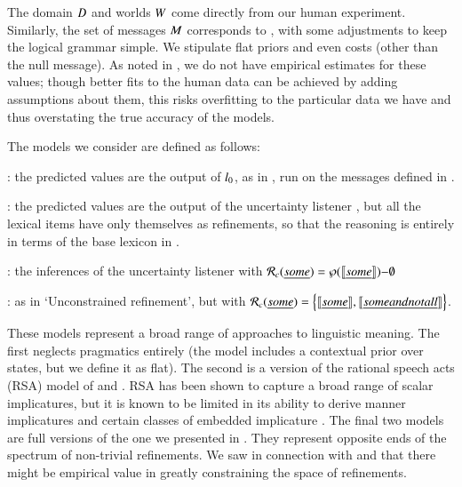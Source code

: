 \documentclass[leqno,12pt]{article}
\begin{document}
The domain $D$ and worlds $W$ come directly from our human
experiment. Similarly, the set of messages $M$ corresponds to
, with some adjustments to keep the logical grammar
simple. We stipulate flat priors and even costs (other than the null
message). As noted in , we do not have empirical
estimates for these values; though better fits to the human data can
be achieved by adding assumptions about them, this risks overfitting
to the particular data we have and thus overstating the true accuracy
of the models.

The models we consider are defined as follows:
%
\begin{examples}
\item 
  \begin{examples}
  \item {}: the predicted values are the output
    of $l_{0}$, as in , run on the messages
    defined in .
  \item {}: the predicted values are the
    output of the uncertainty listener , but all the
    lexical items have only themselves as refinements, so that the
    reasoning is entirely in terms of the base lexicon in
    .
  \item {}: the inferences of the
    uncertainty listener  with $\mathcal{R}_{c}(\emph{some})
    = \wp(\llbracket\emph{some}\rrbracket){-}\emptyset$
  \item {}: as in `Unconstrained
    refinement', but with $\mathcal{R}_{c}(\emph{some}) =
    \left\{ \llbracket\emph{some}\rrbracket, \llbracket\emph{some and not all}\rrbracket \right\}$.
  \end{examples}
\end{examples}

These models represent a broad range of approaches to linguistic
meaning. The first neglects pragmatics entirely (the model includes a
contextual prior over states, but we define it as flat). The second is
a version of the rational speech acts (RSA) model of
\citet{Frank:Goodman:2012} and \citet{Goodman:Stuhlmuller:2013}. RSA
has been shown to capture a broad range of scalar implicatures, but it
is known to be limited in its ability to derive manner implicatures
and certain classes of embedded implicature
\citep{Bergen:Goodman:Levy:2012,Bergen:Levy:Goodman:2014}. The final
two models are full versions of the one we presented in
. They represent opposite ends of the spectrum of
non-trivial refinements. We saw in connection with
 and  that there
might be empirical value in greatly constraining the space of
refinements.
\end{document}
